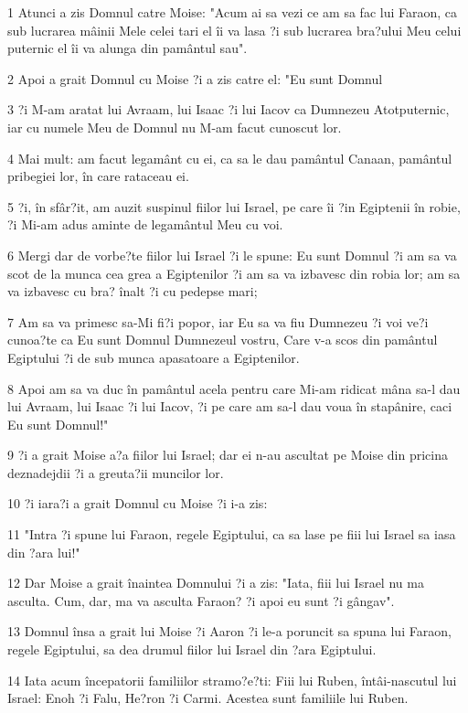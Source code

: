 \par 1 Atunci a zis Domnul catre Moise: "Acum ai sa vezi ce am sa fac lui Faraon, ca sub lucrarea mâinii Mele celei tari el îi va lasa ?i sub lucrarea bra?ului Meu celui puternic el îi va alunga din pamântul sau".
\par 2 Apoi a grait Domnul cu Moise ?i a zis catre el: "Eu sunt Domnul
\par 3 ?i M-am aratat lui Avraam, lui Isaac ?i lui Iacov ca Dumnezeu Atotputernic, iar cu numele Meu de Domnul nu M-am facut cunoscut lor.
\par 4 Mai mult: am facut legamânt cu ei, ca sa le dau pamântul Canaan, pamântul pribegiei lor, în care rataceau ei.
\par 5 ?i, în sfâr?it, am auzit suspinul fiilor lui Israel, pe care îi ?in Egiptenii în robie, ?i Mi-am adus aminte de legamântul Meu cu voi.
\par 6 Mergi dar de vorbe?te fiilor lui Israel ?i le spune: Eu sunt Domnul ?i am sa va scot de la munca cea grea a Egiptenilor ?i am sa va izbavesc din robia lor; am sa va izbavesc cu bra? înalt ?i cu pedepse mari;
\par 7 Am sa va primesc sa-Mi fi?i popor, iar Eu sa va fiu Dumnezeu ?i voi ve?i cunoa?te ca Eu sunt Domnul Dumnezeul vostru, Care v-a scos din pamântul Egiptului ?i de sub munca apasatoare a Egiptenilor.
\par 8 Apoi am sa va duc în pamântul acela pentru care Mi-am ridicat mâna sa-l dau lui Avraam, lui Isaac ?i lui Iacov, ?i pe care am sa-l dau voua în stapânire, caci Eu sunt Domnul!"
\par 9 ?i a grait Moise a?a fiilor lui Israel; dar ei n-au ascultat pe Moise din pricina deznadejdii ?i a greuta?ii muncilor lor.
\par 10 ?i iara?i a grait Domnul cu Moise ?i i-a zis:
\par 11 "Intra ?i spune lui Faraon, regele Egiptului, ca sa lase pe fiii lui Israel sa iasa din ?ara lui!"
\par 12 Dar Moise a grait înaintea Domnului ?i a zis: "Iata, fiii lui Israel nu ma asculta. Cum, dar, ma va asculta Faraon? ?i apoi eu sunt ?i gângav".
\par 13 Domnul însa a grait lui Moise ?i Aaron ?i le-a poruncit sa spuna lui Faraon, regele Egiptului, sa dea drumul fiilor lui Israel din ?ara Egiptului.
\par 14 Iata acum începatorii familiilor stramo?e?ti: Fiii lui Ruben, întâi-nascutul lui Israel: Enoh ?i Falu, He?ron ?i Carmi. Acestea sunt familiile lui Ruben.
